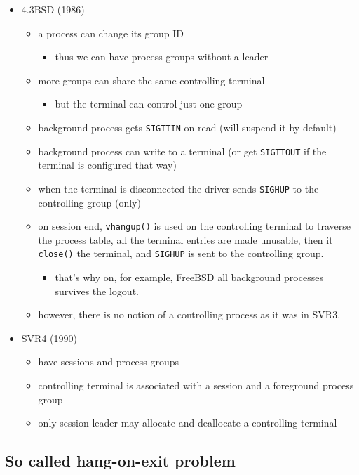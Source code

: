 \begin{itemize}
\item 4.3BSD (1986)
\begin{itemize}
	\item a process can change its group ID
\begin{itemize}
		\item thus we can have process groups without a leader
\end{itemize}
	\item more groups can share the same controlling terminal
\begin{itemize}
		\item but the terminal can control just one group
\end{itemize}
	\item background process gets \texttt{SIGTTIN} on read (will suspend it
	by default)
	\item background process can write to a terminal (or get
	\texttt{SIGTTOUT} if the terminal is configured that way)
	\item when the terminal is disconnected the driver sends \texttt{SIGHUP}
	to the controlling group (only)
	\item on session end, \texttt{vhangup()} is used on the controlling
	terminal to traverse the process table, all the terminal entries are
	made unusable, then it \texttt{close()} the terminal, and
	\texttt{SIGHUP} is sent to the controlling group.
\begin{itemize}
		\item that's why on, for example, FreeBSD all background
		processes survives the logout.
\end{itemize}
	\item however, there is no notion of a controlling process as it was in
	SVR3.
\end{itemize}

\item SVR4 (1990)
\begin{itemize}
	\item have sessions and process groups
	\item controlling terminal is associated with a session and a foreground
	process group
	\item only session leader may allocate and deallocate a controlling
	terminal
\end{itemize}
\end{itemize}

\subsection{So called hang-on-exit problem}

